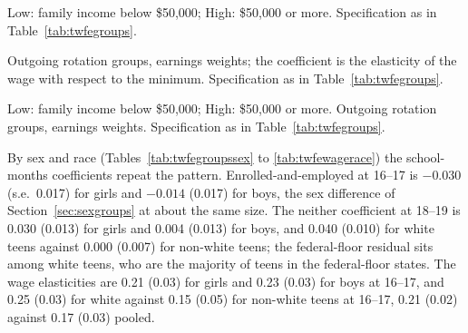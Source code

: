 \documentclass[12pt]{article}
\begin{document}
\begin{table}[H]
\centering
\caption{Two-way fixed effects estimates for school--work status by family income, school months}
\label{tab:twfegroupsses}
\small

\begin{tablenotes}\footnotesize
\item Low: family income below \$50,000; High: \$50,000 or more. Specification as in Table~\ref{tab:twfegroups}.
\end{tablenotes}
\end{table}

\begin{table}[H]
\centering
\caption{Two-way fixed effects estimates for teen wages and earnings, school months, 2010--2026}
\label{tab:twfewage}
\small

\begin{tablenotes}\footnotesize
\item Outgoing rotation groups, earnings weights; the coefficient is the elasticity of the wage with respect to the minimum. Specification as in Table~\ref{tab:twfegroups}.
\end{tablenotes}
\end{table}

\begin{table}[H]
\centering
\caption{Two-way fixed effects estimates for wages and earnings by family income, school months}
\label{tab:twfewageses}
\small

\begin{tablenotes}\footnotesize
\item Low: family income below \$50,000; High: \$50,000 or more. Outgoing rotation groups, earnings weights. Specification as in Table~\ref{tab:twfegroups}.
\end{tablenotes}
\end{table}

By sex and race (Tables~\ref{tab:twfegroupssex} to \ref{tab:twfewagerace}) the school-months coefficients repeat the pattern. Enrolled-and-employed at 16--17 is $-0.030$ (s.e.\ 0.017) for girls and $-0.014$ (0.017) for boys, the sex difference of Section~\ref{sec:sexgroups} at about the same size. The neither coefficient at 18--19 is 0.030 (0.013) for girls and 0.004 (0.013) for boys, and 0.040 (0.010) for white teens against 0.000 (0.007) for non-white teens; the federal-floor residual sits among white teens, who are the majority of teens in the federal-floor states. The wage elasticities are 0.21 (0.03) for girls and 0.23 (0.03) for boys at 16--17, and 0.25 (0.03) for white against 0.15 (0.05) for non-white teens at 16--17, 0.21 (0.02) against 0.17 (0.03) pooled.
\end{document}
